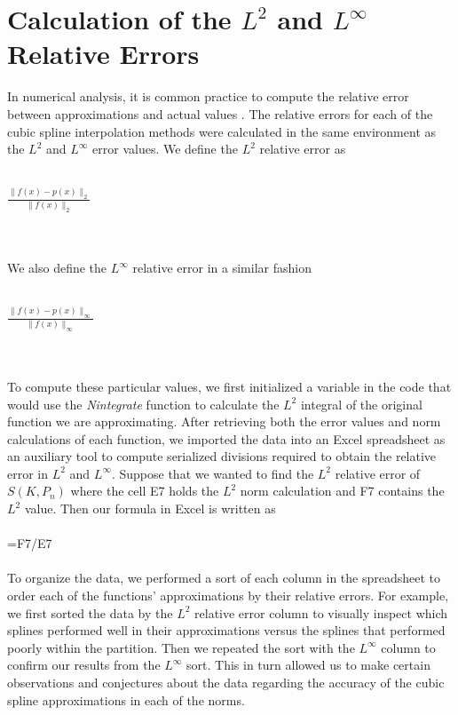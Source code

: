 \section{Calculation of the $L^2$ and $L^{\infty}$ Relative Errors}
In numerical analysis, it is common practice to compute the relative error between approximations and actual values \cite[pg. 17]{key3}. The relative errors for each of the cubic spline interpolation methods were calculated in the same environment as the $L^2$ and $L^{\infty}$ error values. We define the $L^2$ relative error as\\\\
\centerline{$\displaystyle{\frac{\|f(x)-p(x)\|_{2}}{\|f(x)\|_{2}}}$}\\\\
We also define the $L^{\infty}$ relative error in a similar fashion\\\\
\centerline{$\displaystyle{\frac{\|f(x)-p(x)\|_{\infty}}{\|f(x)\|_{\infty}}}$}\\\\
To compute these particular values, we first initialized a variable in the code that would use the \emph{Nintegrate} function to calculate the $L^2$ integral of the original function we are approximating. After retrieving both the error values and norm calculations of each function, we imported the data into an Excel spreadsheet as an auxiliary tool to compute serialized divisions required to obtain the relative error in $L^2$ and $L^{\infty}$. Suppose that we wanted to find the $L^2$ relative error of $S(K, P_{n})$ where the cell E7 holds the $L^2$ norm calculation and F7 contains the $L^2$ value. Then our formula in Excel is written as\\\\
=F7/E7\\\\
To organize the data, we performed a sort of each column in the spreadsheet to order each of the functions' approximations by their relative errors. For example, we first sorted the data by the $L^2$ relative error column to visually inspect which splines performed well in their approximations versus the splines that performed poorly within the partition. Then we repeated the sort with the $L^{\infty}$ column to confirm our results from the $L^{\infty}$ sort. This in turn allowed us to make certain observations and conjectures about the data regarding the accuracy of the cubic spline approximations in each of the norms.
